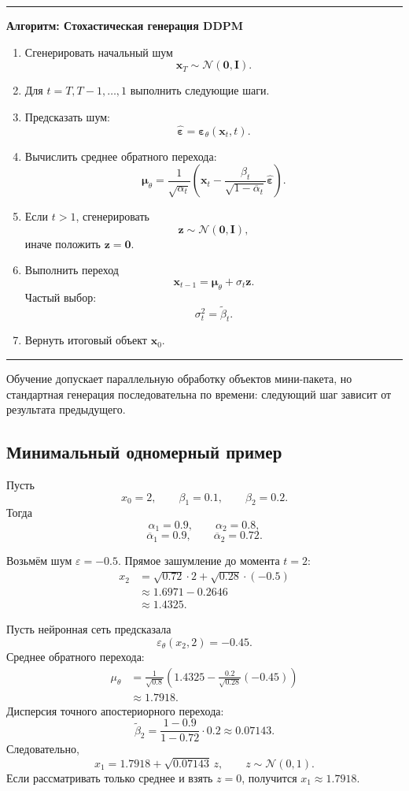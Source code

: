 \documentclass[12pt,a4paper]{article}
\theoremstyle{definition}
\newcommand{\N}{\mathcal{N}}
\newcommand{\eps}{\varepsilon}
\newcommand{\1}{\mathbf{1}}
\newenvironment{algorithmbox}[1]
{
    \begin{center}
    \begin{minipage}{0.95\textwidth}
    \hrule
    \medskip
    \textbf{Алгоритм: #1}
    \begin{enumerate}[leftmargin=*,label=\arabic*.]
}
{
    \end{enumerate}
    \medskip
    \hrule
    \end{minipage}
    \end{center}
}
\begin{document}
\begin{algorithmbox}{Стохастическая генерация DDPM}
    \item Сгенерировать начальный шум
    \[
        \bm{x}_T\sim\N(\bm{0},\bm{I}).
    \]
    \item Для $t=T,T-1,\ldots,1$ выполнить следующие шаги.
    \item Предсказать шум:
    \[
        \widehat{\bm{\eps}}
        =
        \bm{\eps}_\theta(\bm{x}_t,t).
    \]
    \item Вычислить среднее обратного перехода:
    \[
        \bm{\mu}_\theta
        =
        \frac{1}{\sqrt{\alpha_t}}
        \left(
            \bm{x}_t
            -
            \frac{\beta_t}
                 {\sqrt{1-\overline{\alpha}_t}}
            \widehat{\bm{\eps}}
        \right).
    \]
    \item Если $t>1$, сгенерировать
    \[
        \bm{z}\sim\N(\bm{0},\bm{I}),
    \]
    иначе положить $\bm{z}=\bm{0}$.
    \item Выполнить переход
    \[
        \bm{x}_{t-1}
        =
        \bm{\mu}_\theta
        +
        \sigma_t\bm{z}.
    \]
    Частый выбор:
    \[
        \sigma_t^2=\widetilde{\beta}_t.
    \]
    \item Вернуть итоговый объект $\bm{x}_0$.
\end{algorithmbox}

Обучение допускает параллельную обработку объектов мини-пакета, но
стандартная генерация последовательна по времени: следующий шаг
зависит от результата предыдущего.

\subsection{Минимальный одномерный пример}

Пусть
\[
    x_0=2,\qquad
    \beta_1=0.1,\qquad
    \beta_2=0.2.
\]
Тогда
\[
    \alpha_1=0.9,\qquad
    \alpha_2=0.8,
\]
\[
    \overline{\alpha}_1=0.9,\qquad
    \overline{\alpha}_2=0.72.
\]

Возьмём шум $\eps=-0.5$. Прямое зашумление до момента $t=2$:
\begin{align*}
    x_2
    &=
    \sqrt{0.72}\cdot 2
    +
    \sqrt{0.28}\cdot(-0.5)\\
    &\approx
    1.6971-0.2646\\
    &\approx 1.4325.
\end{align*}

Пусть нейронная сеть предсказала
\[
    \eps_\theta(x_2,2)=-0.45.
\]
Среднее обратного перехода:
\begin{align*}
    \mu_\theta
    &=
    \frac{1}{\sqrt{0.8}}
    \left(
        1.4325
        -
        \frac{0.2}{\sqrt{0.28}}(-0.45)
    \right)\\
    &\approx
    1.7918.
\end{align*}
Дисперсия точного апостериорного перехода:
\[
    \widetilde{\beta}_2
    =
    \frac{1-0.9}{1-0.72}\cdot 0.2
    \approx 0.07143.
\]
Следовательно,
\[
    x_1
    =
    1.7918+\sqrt{0.07143}\,z,
    \qquad
    z\sim\N(0,1).
\]
Если рассматривать только среднее и взять $z=0$, получится
$x_1\approx1.7918$.
\end{document}
